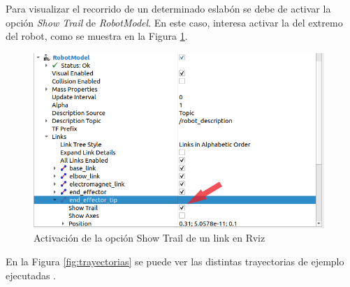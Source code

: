 \newpage
Para visualizar el recorrido de un determinado eslabón se debe de activar la opción \textit{Show Trail} de \textit{RobotModel}. En este caso, interesa activar la 
del extremo del robot, como se muestra en la Figura \ref{fig:activarTrail}.
\begin{figure} [ht!]
    \begin{center}
        \includegraphics[width=11cm]{figs/rviz_show_trail.png}
    \end{center}
    \caption{Activación de la opción Show Trail de un link en Rviz}
\label{fig:activarTrail}
\end{figure}

En la Figura \ref{fig:trayectorias} se puede ver las distintas trayectorias de ejemplo ejecutadas .


